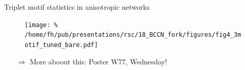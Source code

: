 \begin{frame}{Triplet motif statistics in anisotropic networks}
  
  \begin{figure}
    \centering
    \texttt{[image: \%
    /home/fh/pub/presentations/rsc/18\_BCCN\_fork/figures/fig4\_3motif\_tuned\_bare.pdf]} %
  \end{figure}

\vspace{0.9cm}
  
\begin{itemize}[leftmargin=2cm]

  \Large
  
  \item[$\Rightarrow$] More aboout this: Poster W77, Wednesday!
  
  
\end{itemize}

  
\end{frame}
